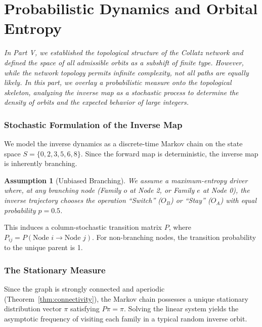 \documentclass[11pt,letterpaper]{amsart}
\def\mathrm#1{#1}%
\def\mathcal#1{#1}%
\def\mathbb#1{#1}%
\theoremstyle{definition}
\theoremstyle{plain}
\theoremstyle{plain}
\newtheorem{assumption}{Assumption}
\theoremstyle{remark}
\begin{document}
\newpage
\part{Probabilistic Dynamics and Orbital Entropy}
\label{part:probability}

\textit{In Part V, we established the topological structure of the Collatz network and defined the space of all admissible orbits as a subshift of finite type. However, while the network topology permits infinite complexity, not all paths are equally likely. In this part, we overlay a probabilistic measure onto the topological skeleton, analyzing the inverse map as a stochastic process to determine the density of orbits and the expected behavior of large integers.}

\section{Stochastic Formulation of the Inverse Map}

We model the inverse dynamics as a discrete-time Markov chain on the state space $S = \{0, 2, 3, 5, 6, 8\}$. Since the forward map is deterministic, the inverse map is inherently branching.

\begin{assumption}[Unbiased Branching]
We assume a maximum-entropy driver where, at any branching node (Family $\mathrm{o}$ at Node 2, or Family $\mathrm{e}$ at Node 0), the inverse trajectory chooses the operation ``Switch'' ($\mathcal{O}_B$) or ``Stay'' ($\mathcal{O}_A$) with equal probability $p=0.5$.
\end{assumption}

This induces a column-stochastic transition matrix $P$, where $P_{ij} = \mathbb{P}(\text{Node } i \to \text{Node } j)$. For non-branching nodes, the transition probability to the unique parent is 1.

\section{The Stationary Measure}

Since the graph is strongly connected and aperiodic (Theorem~\ref{thm:connectivity}), the Markov chain possesses a unique stationary distribution vector $\pi$ satisfying $P \pi = \pi$. Solving the linear system yields the asymptotic frequency of visiting each family in a typical random inverse orbit.
\end{document}

